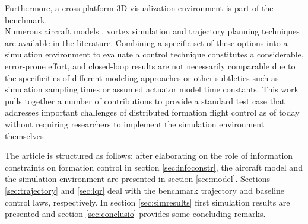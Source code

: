 \documentclass{ifacconf}
\begin{document}
Furthermore, a cross-platform 3D visualization environment is part of the benchmark. \\
Numerous aircraft models \cite{Beard2012}, vortex simulation \cite{Dogan2008b,Saban2009} and trajectory planning techniques are available in the literature. Combining a specific set of these options into a simulation environment to evaluate a control technique constitutes a considerable, error-prone effort, and closed-loop results are not necessarily comparable due to the specificities of different modeling approaches or other subtleties such as simulation sampling times or assumed actuator model time constants. 
This work pulls together a number of contributions to provide a standard test case that addresses important challenges of distributed formation flight control as of today without requiring researchers to implement the simulation environment themselves.

The article is structured as follows: after elaborating on the role of information constraints on formation control in section \ref{sec:infoconstr}, the aircraft model and the simulation environment are presented in section \ref{sec:model}. Sections \ref{sec:trajectory} and \ref{sec:lqr} deal with the benchmark trajectory and baseline control laws, respectively. In section \ref{sec:simresults} first simulation results are presented and section \ref{sec:conclusio} provides some concluding remarks.
%
\end{document}
